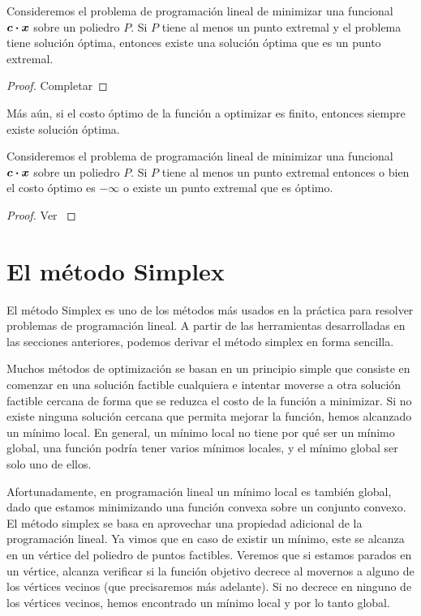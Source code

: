 \begin{theorem}
Consideremos el problema de programación lineal de minimizar una funcional $\bm{c} \boldsymbol{\cdot} \bm{x}$ sobre un poliedro $P$. Si $P$ tiene al menos un punto extremal y el problema tiene solución óptima, entonces existe una solución óptima que es un punto extremal.
\end{theorem}

\begin{proof}
Completar
\end{proof}

Más aún, si el costo óptimo de la función a optimizar es finito, entonces siempre existe solución óptima.

\begin{theorem}
Consideremos el problema de programación lineal de minimizar una funcional $\bm{c} \boldsymbol{\cdot} \bm{x}$ sobre un poliedro $P$. Si $P$ tiene al menos un punto extremal entonces o bien el costo óptimo es $-\infty$ o existe un punto extremal que es óptimo.
\end{theorem}
\begin{proof}
Ver \cite[Teorema 2.8]{Bertsimas1997}
\end{proof}









\section{El método Simplex}

El método Simplex es uno de los métodos más usados en la práctica para resolver problemas de programaci\'on lineal.
A partir de las herramientas desarrolladas en las secciones anteriores, podemos derivar el método simplex en forma sencilla.

Muchos métodos de optimización se basan en un principio simple que consiste en comenzar en una solución factible cualquiera e intentar moverse a otra solución factible cercana de forma que se reduzca el costo de la función a minimizar. Si no existe ninguna solución cercana que permita mejorar la función, hemos alcanzado un mínimo local. En general, un mínimo local no tiene por qué ser un mínimo global, una función podría tener varios mínimos locales, y el mínimo global ser solo uno de ellos.

Afortunadamente, en programación lineal un mínimo local es también global, dado que estamos minimizando una función convexa sobre un conjunto convexo. El método simplex se basa en aprovechar una propiedad adicional de la programación lineal. Ya vimos que en caso de existir un mínimo, este se alcanza en un vértice del poliedro de puntos factibles. Veremos que si estamos parados en un vértice, alcanza verificar si la función objetivo decrece al movernos a alguno de los vértices vecinos (que precisaremos más adelante). Si no decrece en ninguno de los vértices vecinos, hemos encontrado un mínimo local y por lo tanto global.

